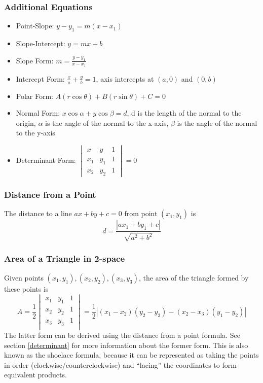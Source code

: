 \documentclass{article}
\begin{document}
\subsubsection{Additional Equations}
\begin{itemize}
    \item Point-Slope: $y-y_1 = m(x-x_1)$
    \item Slope-Intercept: $y=mx+b$
    \item Slope Form: $m=\frac{y-y_1}{x-x_1}$
    \item Intercept Form: $\frac{x}{a} + \frac{y}{b} = 1$, axis intercepts at $(a, 0)$ and $(0, b)$
    \item Polar Form: $A\left(r\cos{\theta}\right)+B\left(r\sin{\theta}\right) + C = 0$
    \item Normal Form: $x\cos{\alpha} + y\cos{\beta} = d$, d is the length of the normal to the origin, $\alpha$ is the angle of the normal to the x-axis, $\beta$ is the angle of the normal to the y-axis
    \item Determinant Form: $\begin{vmatrix}
x & y & 1\\
x_1 & y_1 & 1 \\
x_2 & y_2 & 1
\end{vmatrix}= 0$
\end{itemize}

\subsubsection{Distance from a Point} \label{pt-dist-2-space}
The distance to a line $ax+by+c=0$ from point $(x_1, y_1)$ is
$$d=\frac{\left|ax_1 + by_1 + c\right|}{\sqrt{a^2+b^2}}$$

\subsubsection{Area of a Triangle in 2-space}
Given points $(x_1, y_1), (x_2, y_2), (x_3, y_3)$, the area of the triangle formed by these points is
$$A = \frac{1}{2}\begin{vmatrix}
    x_1 & y_1 & 1 \\
    x_2 & y_2 & 1 \\
    x_3 & y_3 & 1 \\
\end{vmatrix} = \frac{1}{2}\left|(x_1-x_2)(y_2-y_3) - (x_2 - x_3)(y_1 - y_2)\right|$$
The latter form can be derived using the distance from a point formula. See section \ref{determinant} for more information about the former form.
This is also known as the shoelace formula, because it can be represented as taking the points in order (clockwise/counterclockwise) and ``lacing'' the coordinates to form equivalent products.
\end{document}
